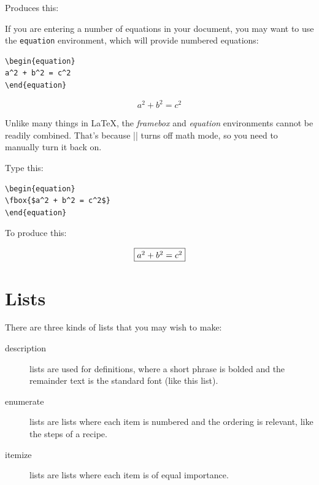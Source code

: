Produces this:

\begin{center}
\end{center}

If you are entering a number of equations in your document, you may want to use
the \texttt{equation} environment, which will provide numbered equations:

\begin{Verbatim}
\begin{equation}
a^2 + b^2 = c^2
\end{equation}
\end{Verbatim}
\begin{equation}
a^2 + b^2 = c^2
\end{equation}

Unlike many things in \LaTeX, the \emph{framebox} and \emph{equation}
environments cannot be readily combined. That's because |\fbox| turns off math
mode, so you need to manually turn it back on.

Type this:

\begin{Verbatim}
\begin{equation}
\fbox{$a^2 + b^2 = c^2$}
\end{equation}
\end{Verbatim}


To produce this:

\begin{equation}
\fbox{$a^2 + b^2 = c^2$}
\end{equation}



\section{Lists}

There are three kinds of lists that you may wish to make:

\begin{description}
\item[description] lists are used for definitions, where a  short phrase is bolded and the remainder text is the standard font (like this list).
 \item[enumerate] lists are lists where each item is numbered and the
  ordering is relevant, like the steps of a recipe. 
\item[itemize] lists are lists where each item is of equal
  importance.
\end{description}

